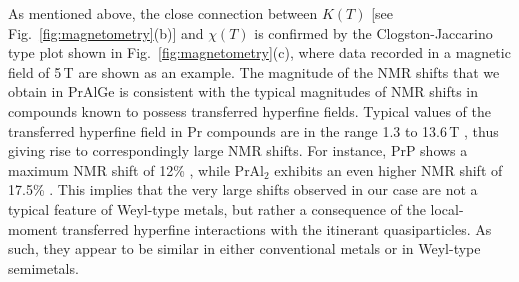 \documentclass[aps,prb,a4paper,10pt,twocolumn,showpacs,floatfix,superscriptaddress,preprintnumbers,longbibliography]{revtex4-2}
\begin{document}
As mentioned above, the close connection between $K(T)$ [see Fig.~\ref{fig:magnetometry}(b)]
and $\chi(T)$ is confirmed by the Clogston-Jaccarino type plot shown in
Fig.~\ref{fig:magnetometry}(c), where data recorded in a magnetic field
of 5\,T are shown as an example.
%
%
%
%
The magnitude of the NMR shifts that we obtain in PrAlGe is consistent with the 
typical magnitudes of NMR shifts in compounds known to possess transferred hyperfine fields. 
Typical values of the transferred hyperfine field in Pr compounds 
are in the range 1.3 to 13.6\,T \cite{dunlap1972orbital,jones1969nuclear}, 
thus giving rise to correspondingly large NMR shifts. For instance, PrP
shows a maximum NMR shift of 12\% \cite{jones1969nuclear},
while PrAl$_{2}$ exhibits an even higher NMR shift of 17.5\% \cite{feller198227Al}.
This implies that the very large shifts observed in our case are
not a typical feature of Weyl-type metals, but rather a consequence of
the local-moment transferred hyperfine interactions with the itinerant
quasiparticles. As such, they appear to be similar in either conventional
metals or in Weyl-type semimetals.

\end{document}
